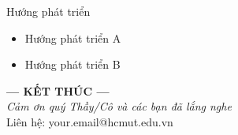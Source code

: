 \documentclass[aspectratio=169]{beamer}
\begin{document}
\begin{frame}{Hướng phát triển}
  \begin{itemize}
    \item Hướng phát triển A
    \item Hướng phát triển B
  \end{itemize}
\end{frame}

\begin{frame}
  \centering
  \vspace{1cm}
  \textbf{\Huge{--- KẾT THÚC ---}}\\
  \vspace{0.2cm}
  \textit{\Large{Cảm ơn quý Thầy/Cô và các bạn đã lắng nghe}}\\
  \vspace{15pt}
  Liên hệ: your.email@hcmut.edu.vn
\end{frame}
\end{document}
